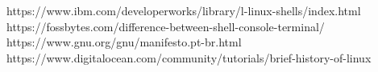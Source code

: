 \documentclass[twoside,twocolumn]{article}
\begin{document}

\begin{thebibliography}{9} %
	
	\newblock https://www.ibm.com/developerworks/library/l-linux-shells/index.html
	\newblock https://fossbytes.com/difference-between-shell-console-terminal/
	\newblock https://www.gnu.org/gnu/manifesto.pt-br.html
	\newblock https://www.digitalocean.com/community/tutorials/brief-history-of-linux
\end{thebibliography}
\end{document}
